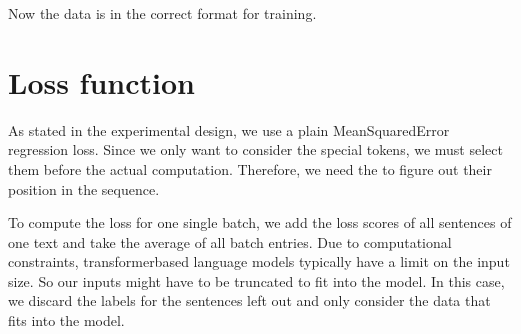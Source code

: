 \documentclass[letterpaper,10pt,english]{jupyterBook}
\begin{document}
\sphinxAtStartPar
Now the data is in the correct format for training.


\section{Loss function}
\label{\detokenize{Prerequisites:loss-function}}
\sphinxAtStartPar
As stated in the experimental design, we use a plain Mean\sphinxhyphen{}Squared\sphinxhyphen{}Error regression loss. Since we only want to consider the special tokens, we must select them before the actual computation. Therefore, we need the  to figure out their position in the sequence.

\sphinxAtStartPar
To compute the loss for one single batch, we add the loss scores of all sentences of one text and take the average of all batch entries.
Due to computational constraints, transformer\sphinxhyphen{}based language models typically have a limit on the input size. So our inputs might have to be truncated to fit into the model. In this case, we discard the labels for the sentences left out and only consider the data that fits into the model.
\end{document}

